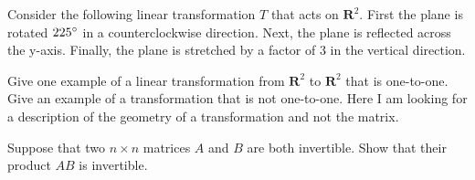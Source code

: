 \documentclass[12pt]{exam}
\begin{document}
\begin{questions}

\question
Consider the following linear transformation $T$ that acts on $\mathbf{R}^2$.  First the plane is rotated $225 \degree$ in a counterclockwise direction.  Next, the plane is reflected across the y-axis.  Finally, the plane is stretched by a factor of 3 in the vertical direction.

\question
Give one example of a linear transformation from $\mathbf{R}^2$ to $\mathbf{R}^2$ that is one-to-one.  Give an example of a transformation that is not one-to-one.  Here I am looking for a description of the geometry of a transformation and not the matrix.

\question 
Suppose that two $n \times n$ matrices $A$ and $B$ are both invertible.  Show that their product $AB$ is invertible.

\end{questions}
\end{document}
